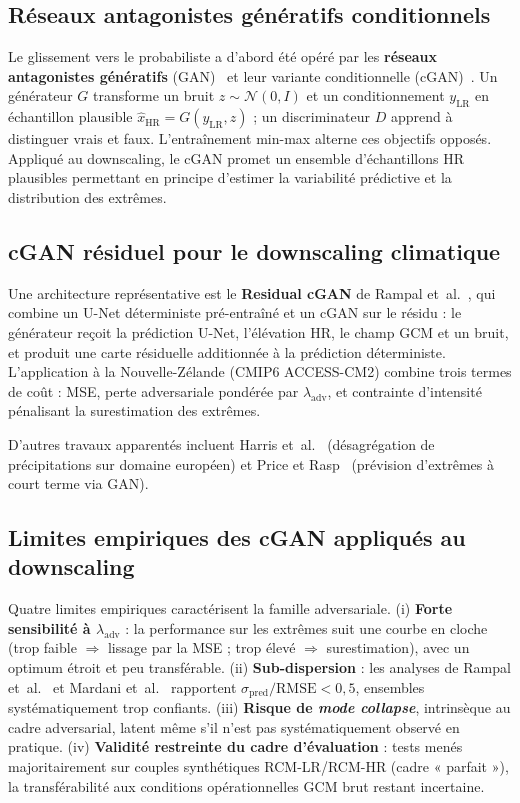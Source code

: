 \documentclass[14pt,a4paper,openany]{extreport}
\theoremstyle{definition}
\newcommand{\LR}{\ensuremath{\text{LR}}}
\newcommand{\HR}{\ensuremath{\text{HR}}}
\newcommand{\yLR}{\ensuremath{y_{\LR}}}
\begin{document}
\subsection{Réseaux antagonistes génératifs conditionnels}
\label{ssec:soa-cgan}

Le glissement vers le probabiliste a d'abord été opéré par les \textbf{réseaux antagonistes génératifs} (GAN)~\cite{goodfellow_gan_2014} et leur variante conditionnelle (cGAN)~\cite{mirza_cgan_2014}. Un générateur $G$ transforme un bruit $z \sim \mathcal{N}(0,I)$ et un conditionnement $\yLR$ en échantillon plausible $\hat{x}_{\HR} = G(\yLR, z)$ ; un discriminateur $D$ apprend à distinguer vrais et faux. L'entraînement min-max alterne ces objectifs opposés. Appliqué au downscaling, le cGAN promet un ensemble d'échantillons HR plausibles permettant en principe d'estimer la variabilité prédictive et la distribution des extrêmes.

\subsection{cGAN résiduel pour le downscaling climatique}
\label{ssec:soa-rampal}

Une architecture représentative est le \textbf{Residual cGAN} de Rampal et~al.~\cite{rampal_cgan_2024}, qui combine un U-Net déterministe pré-entraîné et un cGAN sur le résidu : le générateur reçoit la prédiction U-Net, l'élévation HR, le champ GCM et un bruit, et produit une carte résiduelle additionnée à la prédiction déterministe. L'application à la Nouvelle-Zélande (CMIP6 ACCESS-CM2) combine trois termes de coût : MSE, perte adversariale pondérée par $\lambda_{\mathrm{adv}}$, et contrainte d'intensité pénalisant la surestimation des extrêmes.

D'autres travaux apparentés incluent Harris et~al.~\cite{harris_2022} (désagrégation de précipitations sur domaine européen) et Price et Rasp~\cite{price_rasp_2022} (prévision d'extrêmes à court terme via GAN).

\subsection{Limites empiriques des cGAN appliqués au downscaling}
\label{ssec:soa-cgan-limites}

Quatre limites empiriques caractérisent la famille adversariale. (i) \textbf{Forte sensibilité à $\lambda_{\mathrm{adv}}$} : la performance sur les extrêmes suit une courbe en cloche (trop faible $\Rightarrow$ lissage par la MSE ; trop élevé $\Rightarrow$ surestimation), avec un optimum étroit et peu transférable. (ii) \textbf{Sub-dispersion} : les analyses de Rampal et~al.~\cite{rampal_cgan_2024} et Mardani et~al.~\cite{mardani_corrdiff_2023} rapportent $\sigma_{\mathrm{pred}}/\mathrm{RMSE} < 0{,}5$, ensembles systématiquement trop confiants. (iii) \textbf{Risque de \emph{mode collapse}}, intrinsèque au cadre adversarial, latent même s'il n'est pas systématiquement observé en pratique. (iv) \textbf{Validité restreinte du cadre d'évaluation} : tests menés majoritairement sur couples synthétiques RCM-LR/RCM-HR (cadre « parfait »), la transférabilité aux conditions opérationnelles GCM brut restant incertaine.
\end{document}
